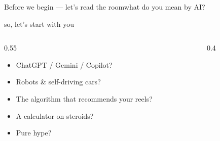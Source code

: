 \begin{frame}{Before we begin --- let's read the room}{what do you mean by AI?}
    \vspace{0.2cm}
    \begin{center}
        {\color{softgray}\small so, let's start with you}
        \vspace{0.15cm}

    \end{center}
    \vspace{0.2cm}
    \begin{columns}
        \begin{column}{0.55\textwidth}
            \pause\begin{itemize}[<+->]
                \item ChatGPT / Gemini / Copilot?
                \item Robots \& self-driving cars?
                \item The algorithm that recommends your reels?
                \item A calculator on steroids?
                \item Pure hype?
            \end{itemize}
        \end{column}
        \begin{column}{0.4\textwidth}
        \end{column}
    \end{columns}
\end{frame}
